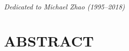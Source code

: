 \documentclass[10pt]{report}
\begin{document}
\newenvironment{preliminary}{}{}
\titleformat{\chapter}[hang]{\large\center}{\thechapter}{0 pt}{}
\titlespacing*{\chapter}{0pt}{-33 pt}{6 pt} %
\begin{preliminary}

\setcounter{page}{3}  %
\begin{center}
\textit{Dedicated to Michael Zhao (1995--2018)}
\end{center}


% 


\clearpage
\chapter*{ABSTRACT}
\begin{center}
\mytitle

\myauthor

\mysupervisorname

\end{center}



\clearpage
\tableofcontents





\end{preliminary}
\end{document}
